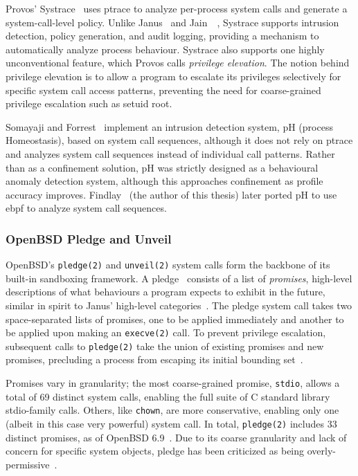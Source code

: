 \documentclass[
  fontsize=12pt,
  titlepage=firstiscover,
  paper=letter,
oneside,
  cleardoublepage=plain,
  parskip=half-,
  DIV=10,
  parindent,
  appendixprefix,
  chapterprefix,
  listof=totoc,
]{scrbook}
\begin{document}
Provos' Systrace~\cite{provos2003_systrace} uses ptrace to analyze per-process system
calls and generate a system-call-level policy. Unlike Janus~\cite{goldberg96_janus,
wagner1999_janus} and Jain~\etal~\cite{jain2000_filtering}, Systrace supports intrusion
detection, policy generation, and audit logging, providing a mechanism to automatically
analyze process behaviour. Systrace also supports one highly unconventional feature, which
Provos calls \textit{privilege elevation}. The notion behind privilege elevation is to
allow a program to escalate its privileges selectively for specific system call access
patterns, preventing the need for coarse-grained privilege escalation such as setuid root.

Somayaji and Forrest~\cite{somayaji2000_ph} implement an intrusion detection system, pH
(process Homeostasis), based on system call sequences, although it does not rely on ptrace
and analyzes system call sequences instead of individual call patterns. Rather than as
a confinement solution, pH was strictly designed as a behavioural anomaly detection
system, although this approaches confinement as profile accuracy improves.
Findlay~\cite{findlay2020_ebph} (the author of this thesis) later ported pH to use
\gls{ebpf} to analyze system call sequences.

\subsubsection*{OpenBSD Pledge and Unveil}
\label{sss:pledge}

OpenBSD's \texttt{pledge(2)} and \texttt{unveil(2)} system calls form the backbone of its
built-in sandboxing framework. A pledge~\cite{pledge} consists of a list of
\textit{promises}, high-level descriptions of what behaviours a program expects to exhibit
in the future, similar in spirit to Janus' high-level categories~\cite{goldberg96_janus,
wagner1999_janus}. The pledge system call takes two space-separated lists of promises, one
to be applied immediately and another to be applied upon making an \texttt{execve(2)}
call. To prevent privilege escalation, subsequent calls to \texttt{pledge(2)} take the
union of existing promises and new promises, precluding a process from escaping its
initial bounding set~\cite{pledge}.

Promises vary in granularity; the most coarse-grained promise, \texttt{stdio}, allows
a total of 69 distinct system calls, enabling the full suite of C standard library
stdio-family calls. Others, like \texttt{chown}, are more conservative, enabling only one
(albeit in this case very powerful) system call. In total, \texttt{pledge(2)} includes 33
distinct promises, as of OpenBSD 6.9~\cite{pledge}. Due to its coarse granularity and lack
of concern for specific system objects, pledge has been criticized as being
overly-permissive~\cite{anderson2017_comparison}.
\end{document}
